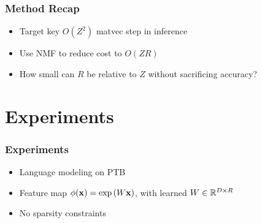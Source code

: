 \documentclass{beamer}
\begin{document}
\begin{frame}
\frametitle{Method Recap}
\begin{itemize}
\item Target key $O(Z^2)$ matvec step in inference
\vspace{2em}
\item Use NMF to reduce cost to $O(ZR)$
\vspace{2em}
\item How small can $R$ be relative to $Z$ without sacrificing accuracy?
\end{itemize}
\end{frame}


\section{Experiments}

\begin{frame}
\frametitle{Experiments}
\begin{itemize}
\item Language modeling on PTB
\vspace{2em}
\item Feature map $\phi(\mathbf{x}) = \exp\left(W\mathbf{x}\right)$,
with learned $W\in\mathbb{R}^{D \times R}$
\vspace{2em}
\item No sparsity constraints
\end{itemize}
\end{frame}
\end{document}
